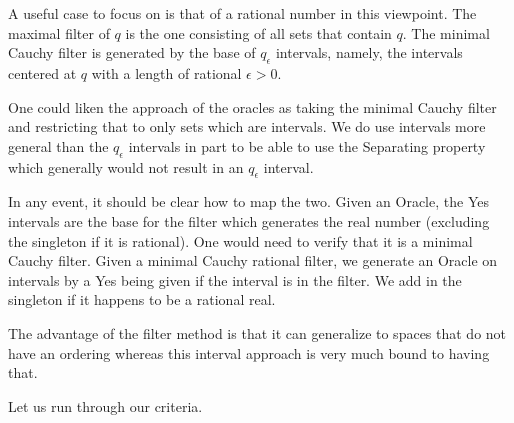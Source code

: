 \documentclass[12pt]{article}
\theoremstyle{remark}
\begin{document}
A useful case to focus on is that of a rational number in this viewpoint. The maximal filter of $q$ is the one consisting of all sets that contain $q$. The minimal Cauchy filter is generated by the base of $q_{\epsilon}$ intervals, namely, the intervals centered at $q$ with a length of rational $\epsilon>0$.

One could liken the approach of the oracles as taking the minimal Cauchy filter and restricting that to only sets which are intervals. We do use intervals more general than the $q_{\epsilon}$ intervals in part to be able to use the Separating property which generally would not result in an $q_\epsilon$ interval. 

In any event, it should be clear how to map the two. Given an Oracle, the Yes intervals are the base for the filter which generates the real number (excluding the singleton if it is rational). One would need to verify that it is a minimal Cauchy filter. Given a minimal Cauchy rational filter, we generate an Oracle on intervals by a Yes being given if the interval is in the filter. We add in the singleton if it happens to be a rational real. 

The advantage of the filter method is that it can generalize to spaces that do not have an ordering whereas this interval approach is very much bound to having that. 

Let us run through our criteria. 
\end{document}
